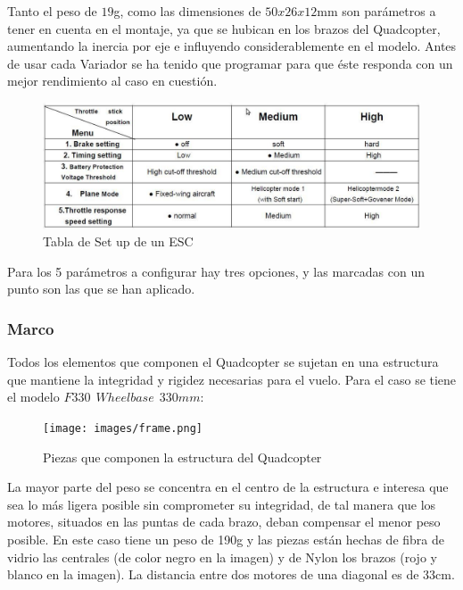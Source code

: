 \documentclass[twoside,11pt]{book}
\begin{document}
Tanto el peso de $19$g,  como las dimensiones de $50x26x12$mm son parámetros a tener en cuenta en el montaje, ya que se hubican en los brazos del Quadcopter, aumentando la inercia por eje e influyendo considerablemente en el modelo. Antes de usar cada Variador se ha tenido que programar para que éste responda con un mejor rendimiento al caso en cuestión.

\begin{figure}[h!]
\begin{center}
\includegraphics[scale=0.45,bb=0 0 1053 352]{images/ESC_config.png}
\caption{Tabla de Set up de un ESC}
\end{center}
\end{figure}

Para los 5 parámetros a configurar hay tres opciones, y las marcadas con un punto son las que se han aplicado.

\subsubsection*{Marco}

Todos los elementos que componen el Quadcopter se sujetan en una estructura que mantiene la integridad y rigidez necesarias para el vuelo. Para el caso se tiene el modelo $F330\>\>Wheelbase\>\>330mm$:

\begin{figure}[h!]
\begin{center}
\texttt{[image: images/frame.png]}
\caption{Piezas que componen la estructura del Quadcopter}
\end{center}
\end{figure}

La mayor parte del peso se concentra en el centro de la estructura e interesa que sea lo más ligera posible sin comprometer su integridad, de tal manera que los motores, situados en las puntas de cada brazo, deban compensar el menor peso posible. En este caso tiene un peso de 190g y las piezas están hechas de fibra de vidrio las centrales (de color negro en la imagen) y de Nylon los brazos (rojo y blanco en la imagen). La distancia entre dos motores de una diagonal es de 33cm.
\end{document}
